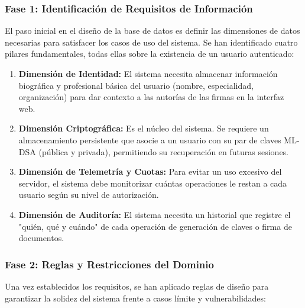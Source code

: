 \documentclass[11pt, a4paper]{report}
\theoremstyle{definition}
\begin{document}
\subsubsection{Fase 1: Identificación de Requisitos de Información}

El paso inicial en el diseño de la base de datos es definir las dimensiones de datos necesarias para satisfacer los casos de uso del sistema. Se han identificado cuatro pilares fundamentales, todas ellas sobre la existencia de un usuario autenticado:

\begin{enumerate}
    \item \textbf{Dimensión de Identidad:} El sistema necesita almacenar información biográfica y profesional básica del usuario (nombre, especialidad, organización) para dar contexto a las autorías de las firmas en la interfaz web.
    \item \textbf{Dimensión Criptográfica:} Es el núcleo del sistema. Se requiere un almacenamiento persistente que asocie a un usuario con su par de claves ML-DSA (pública y privada), permitiendo su recuperación en futuras sesiones.
    \item \textbf{Dimensión de Telemetría y Cuotas:} Para evitar un uso excesivo del servidor, el sistema debe monitorizar cuántas operaciones le restan a cada usuario según su nivel de autorización.
    \item \textbf{Dimensión de Auditoría:} El sistema necesita un historial que registre el "quién, qué y cuándo" de cada operación de generación de claves o firma de documentos.
\end{enumerate}

\subsubsection{Fase 2: Reglas y Restricciones del Dominio}

Una vez establecidos los requisitos, se han aplicado reglas de diseño para garantizar la solidez del sistema frente a casos límite y vulnerabilidades:
\end{document}
